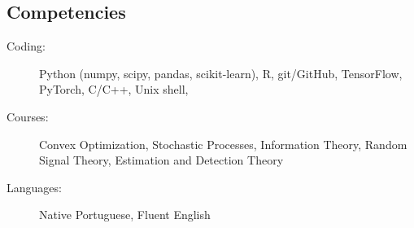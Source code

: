 \documentclass[10pt]{article}
\begin{document}
\begin{titlepage}
\section*{Competencies}
\begin{description}
    \item[Coding:] Python (numpy, scipy, pandas, scikit-learn), R, git/GitHub, TensorFlow, PyTorch, C/C++, Unix shell,
    \item[Courses:] Convex Optimization, Stochastic Processes, Information Theory, Random Signal Theory,
      Estimation and Detection Theory
    \item[Languages:] Native Portuguese, Fluent English
\end{description}

\end{titlepage}
\end{document}
